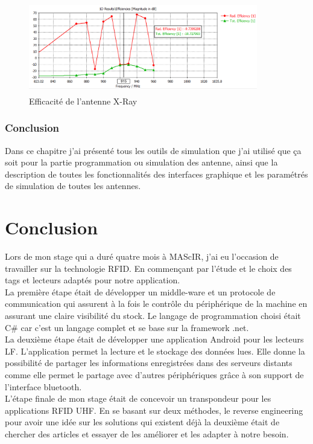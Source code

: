 \documentclass[11pt, a4paper, twoside]{book}
\begin{document}
\begin{figure}[H]
\centering
\includegraphics[width=10cm,height=4cm]{useeff}
\caption{Efficacité de l'antenne X-Ray}
\end{figure} 
\subsection{Conclusion}
Dans ce chapitre j'ai présenté tous les outils de simulation que j'ai utilisé que ça soit pour la partie programmation ou simulation des antenne, ainsi que la description de toutes les fonctionnalités des interfaces graphique et les paramétrés de simulation de toutes les antennes.

\chapter*{Conclusion}
Lors de mon stage qui a duré quatre mois à MAScIR, j'ai eu l'occasion de travailler sur la technologie RFID. En commençant par l'étude et le choix des tags et lecteurs adaptés pour notre application.\\

La première étape était de développer un middle-ware et un protocole de communication qui assurent à la fois le contrôle du périphérique de la machine en assurant une claire visibilité du stock. Le langage de programmation choisi était C\# car c'est un langage complet et se base sur la framework .net.\\

La deuxième étape était de développer une application Android pour les lecteurs LF. L'application permet la lecture et le stockage des données lues. Elle donne la possibilité de partager les informations enregistrées dans des serveurs distants comme elle permet le partage avec d'autres périphériques grâce à son support de l'interface bluetooth.\\

L'étape finale de mon stage était de concevoir un transpondeur pour les applications RFID UHF. En se basant sur deux méthodes, le reverse engineering pour avoir une idée sur les solutions qui existent déjà  la deuxième était de chercher des articles et essayer de les améliorer et les adapter à notre besoin.\\
\end{document}
